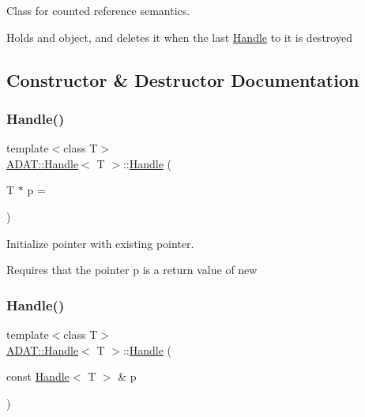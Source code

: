 Class for counted reference semantics. 

Holds and object, and deletes it when the last \mbox{\hyperlink{classADAT_1_1Handle}{Handle}} to it is destroyed 

\subsection{Constructor \& Destructor Documentation}
\mbox{\label{classADAT_1_1Handle_a510e41b73c3f685f4eb78a91020782c0}} 
\subsubsection{\texorpdfstring{Handle()}{Handle()}\hspace{0.1cm}{\footnotesize\ttfamily [1/4]}}
{\footnotesize\ttfamily template$<$class T$>$ \\
\mbox{\hyperlink{classADAT_1_1Handle}{A\+D\+A\+T\+::\+Handle}}$<$ T $>$\+::\mbox{\hyperlink{classADAT_1_1Handle}{Handle}} (\begin{DoxyParamCaption}\item[{T $\ast$}]{p = {} }\end{DoxyParamCaption})\hspace{0.3cm}{\ttfamily [inline]}}



Initialize pointer with existing pointer. 

Requires that the pointer p is a return value of new \mbox{\label{classADAT_1_1Handle_af9529874ca6ca9db10dbbeeb0a776d84}} 
\subsubsection{\texorpdfstring{Handle()}{Handle()}\hspace{0.1cm}{\footnotesize\ttfamily [2/4]}}
{\footnotesize\ttfamily template$<$class T$>$ \\
\mbox{\hyperlink{classADAT_1_1Handle}{A\+D\+A\+T\+::\+Handle}}$<$ T $>$\+::\mbox{\hyperlink{classADAT_1_1Handle}{Handle}} (\begin{DoxyParamCaption}\item[{const \mbox{\hyperlink{classADAT_1_1Handle}{Handle}}$<$ T $>$ \&}]{p }\end{DoxyParamCaption})\hspace{0.3cm}{\ttfamily [inline]}}



